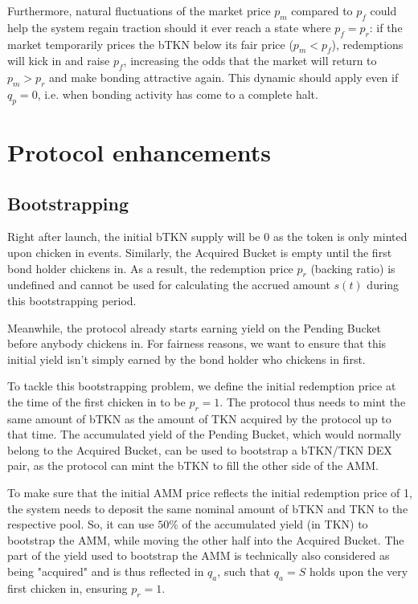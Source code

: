 \documentclass{article}
\begin{document}
Furthermore, natural fluctuations of the market price $p_m$ compared to $p_f$ could help the system regain traction should it ever reach a state where $p_f = p_r$: if the market temporarily prices the bTKN below its fair price ($p_m < p_f$), redemptions will kick in and raise $p_f$, increasing the odds that the market will return to $p_m > p_r$ and make bonding attractive again. This dynamic should apply even if $q_p = 0$, i.e. when bonding activity has come to a complete halt.

\section{Protocol enhancements}
\subsection{Bootstrapping}
  \label{sec:bootstrapping}
Right after launch, the initial bTKN supply will be 0 as the token is only minted upon chicken in events. Similarly, the Acquired Bucket is empty until the first bond holder chickens in. As a result, the redemption price $p_r$ (backing ratio) is undefined and cannot be used for calculating the accrued amount $s(t)$ during this bootstrapping period.

Meanwhile, the protocol already starts earning yield on the Pending Bucket before anybody chickens in. For fairness reasons, we want to ensure that this initial yield isn't simply earned by the bond holder who chickens in first.

To tackle this bootstrapping problem, we define the initial redemption price at the time of the first chicken in to be $p_r = 1$. The protocol thus needs to mint the same amount of bTKN as the amount of TKN acquired by the protocol up to that time. The accumulated yield of the Pending Bucket, which would normally belong to the Acquired Bucket, can be used to bootstrap a bTKN/TKN DEX pair, as the protocol can mint the bTKN to fill the other side of the AMM.

To make sure that the initial AMM price reflects the initial redemption price of 1, the system needs to deposit the same nominal amount of bTKN and TKN to the respective pool. So, it can use $50\%$ of the accumulated yield (in TKN) to bootstrap the AMM, while moving the other half into the Acquired Bucket. The part of the yield used to bootstrap the AMM is technically also considered as being "acquired" and is thus reflected in $q_a$, such that $q_a = S$ holds upon the very first chicken in, ensuring $p_r = 1$.
\end{document}
